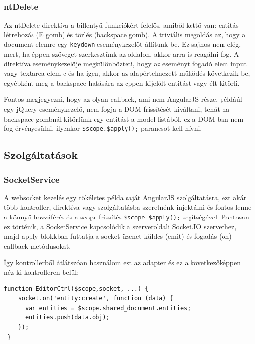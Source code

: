 \subsubsection{ntDelete}

Az ntDelete direktíva a billentyű funkciókért felelős, amiből kettő van: entitás létrehozás (E gomb) és törlés (backspace gomb). A triviális megoldás az, hogy a document elemre egy \lstinline{keydown} eseménykezelőt állítunk be. Ez sajnos nem elég, mert, ha éppen szöveget szerkesztünk az oldalon, akkor arra is reagálni fog. A direktíva eseménykezelője megkülönbözteti, hogy az eseményt fogadó elem input vagy textarea elem-e és ha igen, akkor az alapértelmezett működés következik be, egyébként meg a backspace hatására az éppen kijelölt entitást vagy élt kitörli.

Fontos megjegyezni, hogy az olyan callback, ami nem AngularJS része, példáúl egy jQuery eseménykezelő, nem fogja a DOM frissítését kiváltani, tehát ha backspace gombnál kitörlünk egy entitást a model listából, ez a DOM-ban nem fog érvényesülni, ilyenkor \lstinline{$scope.$apply();} parancsot kell hívni. 

\subsection{Szolgáltatások}

\subsubsection{SocketService}

A websocket kezelés egy tökéletes példa saját AngularJS szolgáltatásra, ezt akár több kontroller, direktíva vagy szolgáltatásba szeretnénk injektálni és fontos lenne a könnyű hozzáférés és a scope frissítés \lstinline{$scope.$apply();} segítségével. Pontosan ez történik, a SocketService kapcsolódik a szerveroldali Socket.IO szerverhez, majd apply blokkban futtatja a socket üzenet küldés (emit) és fogadás (on) callback metódusokat.

Így kontrollerből átlátszóan használom ezt az adapter és ez a következőképpen néz ki kontrolleren belül:

\begin{lstlisting}[caption=Függőséginjektálás kontrollerbe]
 function EditorCtrl($scope,socket, ...) {
    socket.on('entity:create', function (data) {
      var entities = $scope.shared_document.entities;
      entities.push(data.obj);
    });
 }
\end{lstlisting}

